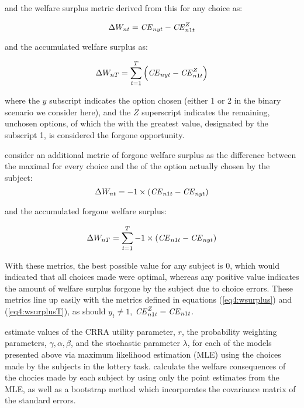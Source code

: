 \documentclass[../main.tex]{subfiles}
\begin{document}
\noindent and the welfare surplus metric derived from this {\CE} for any choice as:

\begin{equation}
	\label{eq4:wsurplus}
	\Delta W_{nt} =  {\mathit{CE}}_{nyt} - {\mathit{CE}}_{n1t}^Z
\end{equation}

\noindent and the accumulated welfare surplus as:

\begin{equation}
	\label{eq4:wsurplusT}
	\Delta W_{nT} = \sum_{t=1}^T \left( {\mathit{CE}}_{nyt} - {\mathit{CE}}_{n1t}^Z \right)
\end{equation}

\noindent where the $y$ subscript indicates the option chosen (either 1 or 2 in the binary scenario we consider here), and the $Z$ superscript indicates the remaining, unchosen options, of which the {\CE} with the greatest value, designated by the subscript 1, is considered the forgone opportunity.

\textcite[106]{Harrison2016} consider an additional metric of forgone welfare surplus as the difference between the maximal {\CE} for every choice and the {\CE} of the option actually chosen by the subject:
\begin{equation}
	\label{eq4:wforgone}
	\Delta W_{nt} = -1 \times \left( {\mathit{CE}}_{n1t} - {\mathit{CE}}_{nyt} \right)
\end{equation}

\noindent and the accumulated forgone welfare surplus:

\begin{equation}
	\label{eq4:wforgone}
	\Delta W_{nT} = \sum_{t=1}^T  -1 \times \left( {\mathit{CE}}_{n1t} - {\mathit{CE}}_{nyt} \right)
\end{equation}

\noindent With these metrics, the best possible value for any subject is 0, which would indicated that all choices made were optimal, whereas any positive value indicates the amount of welfare surplus forgone by the subject due to choice errors.
These metrics line up easily with the metrics defined in equations (\ref{eq4:wsurplus}) and (\ref{eq4:wsurplusT}), as should $y_t \neq 1$, ${\mathit{CE}}_{n1t}^Z = {\mathit{CE}}_{n1t}$.

\textcite{Harrison2016} estimate values of the CRRA utility parameter, $r$, the probability weighting parameters, $\gamma, \alpha, \beta$, and the stochastic parameter $\lambda$, for each of the models presented above via maximum likelihood estimation (MLE) using the choices made by the subjects in the lottery task.
\textcite[107,110]{Harrison2016} calculate the welfare consequences of the chocies made by each subject by using only the point estimates from the MLE, as well as a bootstrap method which incorporates the covariance matrix of the standard errors.
\end{document}
